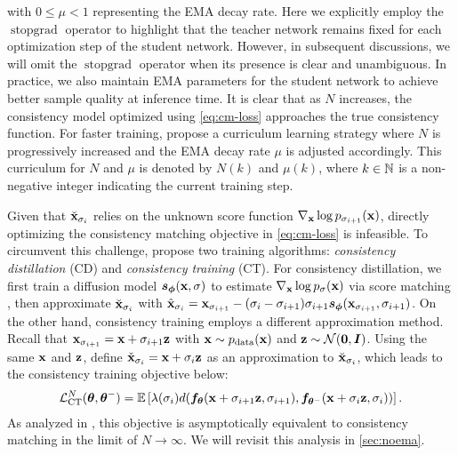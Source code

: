 with $0 \leq \mu < 1$ representing the EMA decay rate. Here we explicitly employ the $\operatorname{stopgrad}$ operator to highlight that the teacher network remains fixed for each optimization step of the student network. However, in subsequent discussions, we will omit the $\operatorname{stopgrad}$ operator when its presence is clear and unambiguous. In practice, we also maintain EMA parameters for the student network to achieve better sample quality at inference time. It is clear that as $N$ increases, the consistency model optimized using \cref{eq:cm-loss} approaches the true consistency function. For faster training, \citet{song2023consistency} propose a curriculum learning strategy where $N$ is progressively increased and the EMA decay rate $\mu$ is adjusted accordingly. This curriculum for $N$ and $\mu$ is denoted by $N(k)$ and $\mu(k)$, where $k \in \mathbb{N}$ is a non-negative integer indicating the current training step.

Given that $\breve{{\mathbf{x}}}_{\sigma_i}$ relies on the unknown score function $\nabla_{\mathbf{x}} \log p_{\sigma_{i+1}}({\mathbf{x}})$, directly optimizing the consistency matching objective in \cref{eq:cm-loss} is infeasible. To circumvent this challenge, \citet{song2023consistency} propose two training algorithms: \emph{consistency distillation} (CD) and \emph{consistency training} (CT). For consistency distillation, we first train a diffusion model ${\bm{s}}_{\bm{\phi}}({\mathbf{x}}, \sigma)$ to estimate $\nabla_{\mathbf{x}} \log p_\sigma({\mathbf{x}})$ via score matching \citep{hyvarinen-EstimationNonNormalizedStatistical-2005,vincent2011connection,song2019sliced,song2019generative}, then approximate $\breve{{\mathbf{x}}}_{\sigma_i}$ with $\hat{{\mathbf{x}}}_{\sigma_i} = {\mathbf{x}}_{\sigma_{i+1}} - (\sigma_i - \sigma_{i+1})\sigma_{i+1} {\bm{s}}_{\bm{\phi}}({\mathbf{x}}_{\sigma_{i+1}}, \sigma_{i+1})$. On the other hand, consistency training employs a different approximation method. Recall that ${\mathbf{x}}_{\sigma_{i+1}} = {\mathbf{x}} + \sigma_{i+1} {\mathbf{z}}$ with ${\mathbf{x}} \sim p_\text{data}({\mathbf{x}})$ and ${\mathbf{z}} \sim \mathcal{N}(\bm{0}, {\bm{I}})$. Using the same ${\mathbf{x}}$ and ${\mathbf{z}}$, \citet{song2023consistency} define $\check{{\mathbf{x}}}_{\sigma_i} = {\mathbf{x}} + \sigma_i {\mathbf{z}}$ as an approximation to $\breve{{\mathbf{x}}}_{\sigma_i}$, which leads to the consistency training objective below:
\begin{align}
\mathcal{L}^N_\text{CT}({\bm{\theta}}, {\bm{\theta}}^{-}) = \mathbb{E}\left[ \lambda(\sigma_i) d({\bm{f}}_{\bm{\theta}}({\mathbf{x}} + \sigma_{i+1}{\mathbf{z}}, \sigma_{i+1}), {\bm{f}}_{{\bm{\theta}}^{-}}({\mathbf{x}} + \sigma_i {\mathbf{z}}, \sigma_i)) \right].\label{eq:ct-loss}
\end{align}
As analyzed in \citet{song2023consistency}, this objective is asymptotically equivalent to consistency matching in the limit of $N\to\infty$. We will revisit this analysis in \cref{sec:noema}.


